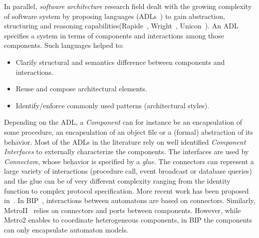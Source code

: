 			 
In parallel, \emph{software architecture} research field dealt with the growing complexity of software system by proposing languages (\ie ADLs~\cite{frameadlsbib, garlansoftarchbib}) to gain abstraction, structuring and reasoning capabilities(\eg Rapide~\cite{rapidebib}, Wright~\cite{wrightbib}, Unicon~\cite{uniconbib}). An ADL specifies a system in terms of components and interactions among those components. Such languages helped to:
\begin{itemize}
	\item Clarify structural and semantics difference between components and interactions.
	\item Reuse and compose architectural elements.
	\item Identify/enforce commonly used patterns (\eg architectural styles).
\end{itemize}

Depending on the ADL, a \emph{Component} can for instance be an encapsulation of some procedure, an encapsulation of an object file or a (formal) abstraction of its behavior. Most of the ADLs in the literature rely on well identified \emph{Component Interfaces} to externally characterize the components. The interfaces are used by \emph{Connector}s, whose behavior is specified by a \emph{glue}. The connectors can represent a large variety of interactions (\eg procedure call, event broadcast or database queries) and the glue can be of very different complexity ranging from the identity function to complex protocol specification. More recent work has been proposed in~\cite{bipbib,metro2bib}. In BIP~\cite{bipbib}, interactions between automatons are based on connectors. Similarly, MetroII~\cite{metro2bib} relies on connectors and ports between components. However, while Metro2 enables to coordinate heterogeneous components, in BIP the components can only encapsulate automaton models.   
			 			
